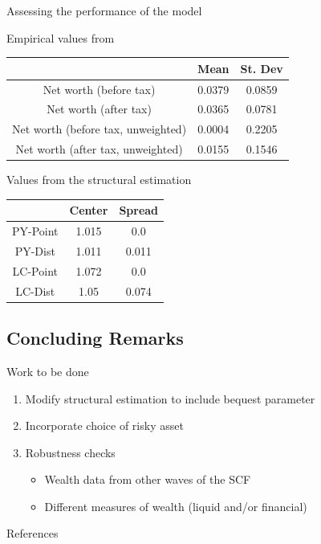 \documentclass{beamer}
\begin{document}

\begin{frame}{Assessing the performance of the model}
\centering

\begin{flushleft}
\par Empirical values from \cite{aflgdmlp20}
\end{flushleft}
    \begin{tabular}{|c|c|c|}
\hline
& Mean & St. Dev \\
\hline
Net worth (before tax) & 0.0379 & 0.0859  \\
Net worth (after tax) & 0.0365 & 0.0781  \\
Net worth (before tax, unweighted) & 0.0004 & 0.2205  \\
Net worth (after tax, unweighted) & 0.0155 & 0.1546  \\
\hline
\end{tabular}
    
\begin{flushleft}
\par Values from the structural estimation
\end{flushleft}
    \begin{tabular}{|c|c|c|}
\hline
& Center & Spread \\
\hline
PY-Point & 1.015 & 0.0  \\
PY-Dist & 1.011  &  0.011  \\
LC-Point & 1.072 & 0.0  \\
LC-Dist & 1.05  &  0.074  \\
\hline
\end{tabular}

\end{frame}

\subsection{Concluding Remarks}

\begin{frame}{Work to be done}
       
       \begin{enumerate}
       \item Modify structural estimation to include bequest parameter
       \item Incorporate choice of risky asset
       \item Robustness checks
       \begin{itemize}
      \item Wealth data from other waves of the SCF
      \item Different measures of wealth (liquid and/or financial)
      \end{itemize}
      \end{enumerate}
  
\end{frame}


\begin{frame}[allowframebreaks]{References}
  \printbibliography
\end{frame}
\end{document}
